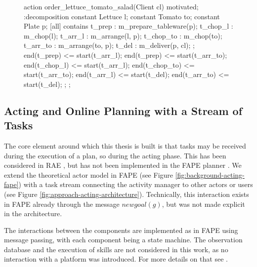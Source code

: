 \begin{figure}
  \begin{anmlcode}
  action order_lettuce_tomato_salad(Client cl) {
    motivated;
    :decomposition {
      constant Lettuce l;
      constant Tomato to;
      constant Plate p;
      [all] contains {
        t_prep : m_prepare_tableware(p);
        t_chop_l : m_chop(l);
        t_arr_l : m_arrange(l, p);
        t_chop_to : m_chop(to);
        t_arr_to : m_arrange(to, p);
        t_del : m_deliver(p, cl);
      };
      end(t_prep) <= start(t_arr_l);
      end(t_prep) <= start(t_arr_to);
      end(t_chop_l) <= start(t_arr_l);
      end(t_chop_to) <= start(t_arr_to);
      end(t_arr_l) <= start(t_del);
      end(t_arr_to) <= start(t_del);
    };
  };
  \end{anmlcode}
  \label{lst:approach-order}
\end{figure}

\subsection{Acting and Online Planning with a Stream of Tasks}
\label{sec:approach-acting}

The core element around which this thesis is built is that tasks may be received during the execution of a plan, so during the acting phase.
This has been considered in \ac{RAE} \citep{ghallabAutomatedPlanningActing2016}, but has not been implemented in the \ac{FAPE} planner \citep{bit-monnotTemporalHierarchicalModels2016a}.
We extend the theoretical actor model in \ac{FAPE} (see Figure \ref{fig:background-acting-fape}) with a task stream connecting the activity manager to other actors or users (see Figure \ref{fig:approach-acting-architecture}).
Technically, this interaction exists in \ac{FAPE} already through the message $newgoal(g)$, but was not made explicit in the architecture.



The interactions between the components are implemented as in \ac{FAPE} using message passing, with each component being a state machine.
The observation database and the execution of skills are not considered in this work, as no interaction with a platform was introduced.
For more details on that see \cite{bit-monnotTemporalHierarchicalModels2016a}.

